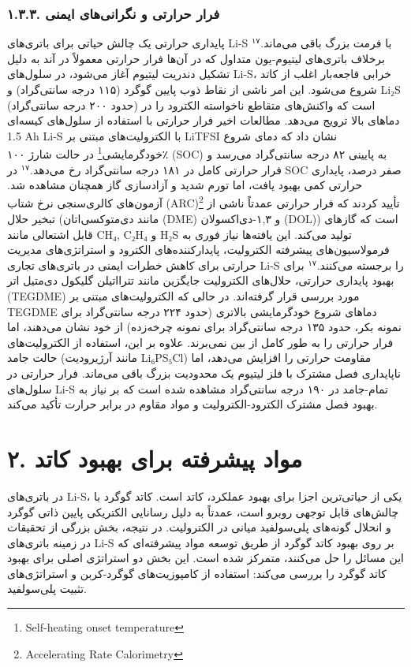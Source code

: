 \documentclass[12pt,a4paper,twocolumn]{article} %
\newcommand{\persian}[1]{\textfarsi{#1}}
\newcommand{\english}[1]{\textenglish{#1}}
\begin{document}
\subsubsection*{\persian{۱.۳.۳. فرار حرارتی و نگرانی‌های ایمنی}}
\persian{
پایداری حرارتی یک چالش حیاتی برای باتری‌های \english{Li-S} با فرمت بزرگ باقی می‌ماند.$^{۱۷}$ برخلاف باتری‌های لیتیوم-یون متداول که در آن‌ها فرار حرارتی معمولاً در آند به دلیل تشکیل دندریت لیتیوم آغاز می‌شود، در سلول‌های \english{Li-S}، خرابی فاجعه‌بار اغلب از کاتد شروع می‌شود. این امر ناشی از نقاط ذوب پایین گوگرد (۱۱۵ درجه سانتی‌گراد) و \english{Li₂S} (حدود ۲۰۰ درجه سانتی‌گراد) است که واکنش‌های متقاطع ناخواسته الکترود را در دماهای بالا ترویج می‌دهد. مطالعات اخیر فرار حرارتی با استفاده از سلول‌های کیسه‌ای \english{1.5 Ah Li-S} با الکترولیت‌های مبتنی بر \english{LiTFSI} نشان داد که دمای شروع خودگرمایشی\footnote{\english{Self-heating onset temperature}} در حالت شارژ ۱۰۰٪ (\english{SOC}) به پایینی ۸۲ درجه سانتی‌گراد می‌رسد و فرار حرارتی کامل در ۱۸۱ درجه سانتی‌گراد رخ می‌دهد.$^{۱۷}$ در \english{SOC} صفر درصد، پایداری حرارتی کمی بهبود یافت، اما تورم شدید و آزادسازی گاز همچنان مشاهده شد. آزمون‌های کالری‌سنجی نرخ شتاب (ARC)\footnote{\english{Accelerating Rate Calorimetry}} تأیید کردند که فرار حرارتی عمدتاً ناشی از تبخیر حلال (مانند دی‌متوکسی‌اتان (\english{DME}) و ۱,۳-دی‌اکسولان (\english{DOL})) است که گازهای قابل اشتعالی مانند \english{CH₄}, \english{C₂H₄} و \english{H₂S} تولید می‌کند. این یافته‌ها نیاز فوری به فرمولاسیون‌های پیشرفته الکترولیت، پایدارکننده‌های الکترود و استراتژی‌های مدیریت حرارتی برای کاهش خطرات ایمنی در باتری‌های تجاری \english{Li-S} را برجسته می‌کنند.$^{۱۷}$
}
\persian{
برای بهبود پایداری حرارتی، حلال‌های الکترولیت جایگزین مانند تترااتیلن گلیکول دی‌متیل اتر (\english{TEGDME}) مورد بررسی قرار گرفته‌اند. در حالی که الکترولیت‌های مبتنی بر \english{TEGDME} دماهای شروع خودگرمایشی بالاتری (حدود ۲۲۴ درجه سانتی‌گراد برای نمونه بکر، حدود ۱۳۵ درجه سانتی‌گراد برای نمونه چرخه‌زده) از خود نشان می‌دهند، اما فرار حرارتی را به طور کامل از بین نمی‌برند. علاوه بر این، استفاده از الکترولیت‌های حالت جامد (مانند آرژیرودیت \english{Li₆PS₅Cl}) مقاومت حرارتی را افزایش می‌دهد، اما ناپایداری فصل مشترک با فلز لیتیوم یک محدودیت بزرگ باقی می‌ماند. فرار حرارتی در سلول‌های \english{Li-S} تمام-جامد در ۱۹۰ درجه سانتی‌گراد مشاهده شده است که بر نیاز به بهبود فصل مشترک الکترود-الکترولیت و مواد مقاوم در برابر حرارت تأکید می‌کند.
}

\section*{\persian{۲. مواد پیشرفته برای بهبود کاتد}}
\persian{
در باتری‌های \english{Li-S}، یکی از حیاتی‌ترین اجزا برای بهبود عملکرد، کاتد است. کاتد گوگرد با چالش‌های قابل توجهی روبرو است، عمدتاً به دلیل رسانایی الکتریکی پایین ذاتی گوگرد و انحلال گونه‌های پلی‌سولفید میانی در الکترولیت. در نتیجه، بخش بزرگی از تحقیقات در زمینه باتری‌های \english{Li-S} بر روی بهبود کاتد گوگرد از طریق توسعه مواد پیشرفته‌ای که این مسائل را حل می‌کنند، متمرکز شده است. این بخش دو استراتژی اصلی برای بهبود کاتد گوگرد را بررسی می‌کند: استفاده از کامپوزیت‌های گوگرد-کربن و استراتژی‌های تثبیت پلی‌سولفید.
}
\end{document}
